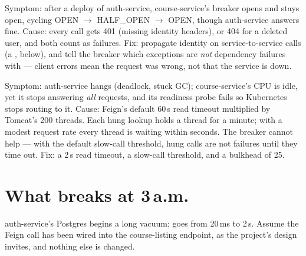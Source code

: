 \begin{pitfall}
Symptom: after a deploy of auth-service, course-service's breaker opens
and stays open, cycling OPEN $\to$ HALF\_OPEN $\to$ OPEN, though
auth-service answers  fine. Cause: every call gets 401
(missing identity headers), or 404 for a deleted user, and both count
as failures. Fix: propagate identity on service-to-service calls (a
, below), and tell the breaker which exceptions
are \emph{not} dependency failures with  ---
client errors mean the request was wrong, not that the service is
down.
\end{pitfall}

\begin{pitfall}
Symptom: auth-service hangs (deadlock, stuck GC); course-service's
CPU is idle, yet it stops answering \emph{all} requests, and its
readiness probe fails so Kubernetes stops routing to it. Cause:
Feign's default 60\,s read timeout multiplied by Tomcat's 200 threads.
Each hung lookup holds a thread for a minute; with a modest request
rate every thread is waiting within seconds. The breaker cannot help
--- with the default slow-call threshold, hung calls are not failures
until they time out. Fix: a 2\,s read timeout, a slow-call threshold,
and a bulkhead of 25.
\end{pitfall}

\section{What breaks at 3\,a.m.}

auth-service's Postgres begins a long vacuum;  goes
from 20\,ms to 2\,s. Assume the Feign call has been wired into the
course-listing endpoint, as the project's design invites, and nothing
else is changed.

